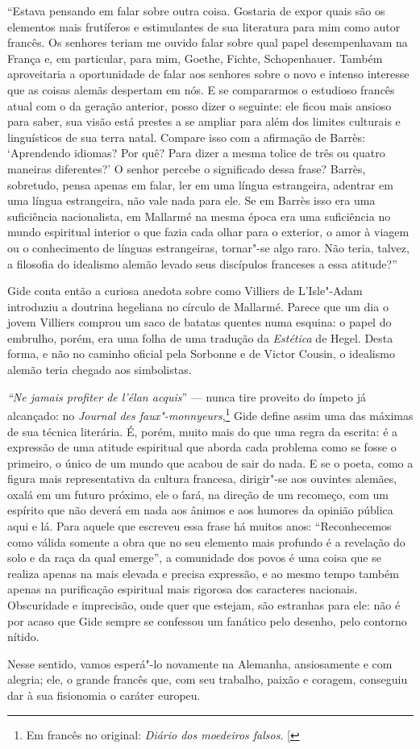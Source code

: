 ``Estava pensando em falar sobre outra coisa. Gostaria de expor quais são
os elementos mais frutíferos e estimulantes de sua literatura para mim
como autor francês. Os senhores teriam me ouvido falar sobre qual papel
desempenhavam na França e, em particular, para mim, Goethe, Fichte,
Schopenhauer. Também aproveitaria a oportunidade de falar aos
senhores sobre o novo e intenso interesse que as coisas alemãs despertam em nós.
E se compararmos o estudioso francês atual com o da geração anterior,
posso dizer o seguinte: ele ficou mais ansioso para saber, sua visão
está prestes a se ampliar para além dos limites culturais e linguísticos
de sua terra natal. Compare isso com a afirmação de Barrès: `Aprendendo
idiomas? Por quê? Para dizer a mesma tolice de três ou quatro maneiras
diferentes?' O senhor percebe o significado dessa frase? Barrès,
sobretudo, pensa apenas em falar, ler em uma língua estrangeira,
adentrar em uma língua estrangeira, não vale nada para ele. Se em Barrès
isso era uma suficiência nacionalista, em Mallarmé na mesma época era
uma suficiência no mundo espiritual interior o que fazia cada olhar para
o exterior, o amor à viagem ou o conhecimento de línguas estrangeiras,
tornar"-se algo raro. Não teria, talvez, a filosofia do idealismo alemão
levado seus discípulos franceses a essa atitude?''

Gide conta então a curiosa anedota sobre como Villiers de L'Isle"-Adam
introduziu a doutrina hegeliana no círculo de Mallarmé. Parece que um
dia o jovem Villiers comprou um saco de batatas quentes numa esquina:
o papel do embrulho, porém, era uma folha de uma tradução da
\emph{Estética} de Hegel. Desta forma, e não no caminho oficial pela
Sorbonne e de Victor Cousin, o idealismo alemão teria chegado aos
simbolistas.

\emph{``Ne jamais profiter de l'élan acquis}'' --- nunca tire proveito do
ímpeto já alcançado: no \emph{Journal des faux"-monnyeurs},\footnote{Em francês no original: \emph{Diário dos moedeiros falsos}. {[}\versal{N.~T.}{]}} Gide define
assim uma das máximas de sua técnica literária. É, porém, muito mais do
que uma regra da escrita: é a expressão de uma atitude espiritual que
aborda cada problema como se fosse o primeiro, o único de um mundo que
acabou de sair do nada. E se o poeta, como a figura mais representativa
da cultura francesa, dirigir"-se aos ouvintes alemães, oxalá em um futuro
próximo, ele o fará, na direção de um recomeço, com um espírito
que não deverá em nada aos ânimos e aos humores da opinião pública aqui
e lá. Para aquele que escreveu essa frase há muitos anos:
``Reconhecemos como válida somente a obra que no seu elemento mais
profundo é a revelação do solo e da raça da qual emerge'', a comunidade
dos povos é uma coisa que se realiza apenas na mais elevada e precisa
expressão, e ao mesmo tempo também apenas na purificação espiritual mais
rigorosa dos caracteres nacionais. Obscuridade e imprecisão, onde quer
que estejam, são estranhas para ele: não é por acaso que Gide sempre se
confessou um fanático pelo desenho, pelo contorno nítido.

Nesse sentido, vamos esperá"-lo novamente na Alemanha, ansiosamente e com
alegria; ele, o grande francês que, com seu trabalho, paixão e
coragem, conseguiu dar à sua fisionomia o caráter europeu.

